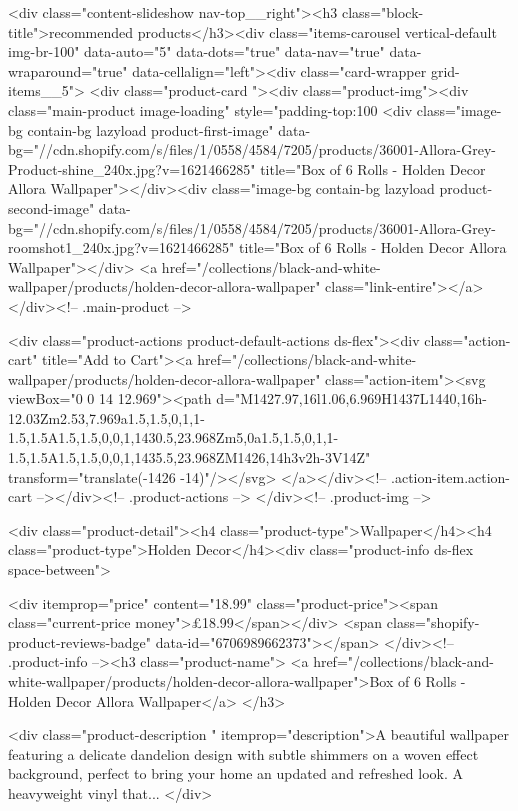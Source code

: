 {{{{{{{<div class="content-slideshow nav-top__right"><h3 class="block-title">recommended products</h3><div class="items-carousel vertical-default img-br-100"
    data-auto="5"
    data-dots="true"
    data-nav="true"
    data-wraparound="true"
    data-cellalign="left"><div class="card-wrapper grid-items__5">
            <div class="product-card "><div class="product-img"><div class="main-product image-loading" style="padding-top:100%
      <div class="image-bg contain-bg lazyload product-first-image" data-bg="//cdn.shopify.com/s/files/1/0558/4584/7205/products/36001-Allora-Grey-Product-shine_240x.jpg?v=1621466285" title="Box of 6 Rolls - Holden Decor Allora Wallpaper"></div><div class="image-bg contain-bg lazyload product-second-image" data-bg="//cdn.shopify.com/s/files/1/0558/4584/7205/products/36001-Allora-Grey-roomshot1_240x.jpg?v=1621466285" title="Box of 6 Rolls - Holden Decor Allora Wallpaper"></div>
      <a href="/collections/black-and-white-wallpaper/products/holden-decor-allora-wallpaper" class="link-entire"></a>
    </div><!-- .main-product -->
  
<div class="product-actions product-default-actions ds-flex"><div class="action-cart" title="Add to Cart"><a href="/collections/black-and-white-wallpaper/products/holden-decor-allora-wallpaper" class="action-item"><svg viewBox="0 0 14 12.969"><path d="M1427.97,16l1.06,6.969H1437L1440,16h-12.03Zm2.53,7.969a1.5,1.5,0,1,1-1.5,1.5A1.5,1.5,0,0,1,1430.5,23.968Zm5,0a1.5,1.5,0,1,1-1.5,1.5A1.5,1.5,0,0,1,1435.5,23.968ZM1426,14h3v2h-3V14Z" transform="translate(-1426 -14)"/></svg>
</a></div><!-- .action-item.action-cart --></div><!-- .product-actions -->
</div><!-- .product-img -->

<div class="product-detail"><h4 class="product-type">Wallpaper</h4><h4 class="product-type">Holden Decor</h4><div class="product-info ds-flex space-between">
    
<div itemprop="price" content="18.99" class="product-price"><span class="current-price money">£18.99</span></div>
    <span class="shopify-product-reviews-badge" data-id="6706989662373"></span>
  </div><!-- .product-info --><h3 class="product-name">
      <a href="/collections/black-and-white-wallpaper/products/holden-decor-allora-wallpaper">Box of 6 Rolls - Holden Decor Allora Wallpaper</a>
    </h3>
    
<div class="product-description " itemprop="description">A beautiful wallpaper featuring a delicate dandelion design with subtle shimmers on a woven effect background, perfect to bring your home an updated and refreshed look. A heavyweight vinyl that...
</div>



}}}}}}}
